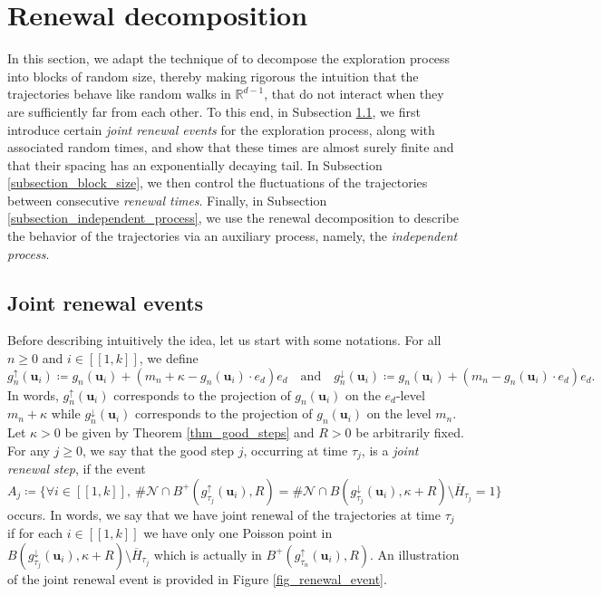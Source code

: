 \documentclass[a4paper, 11pt]{article}
\theoremstyle{plain}
\theoremstyle{definition}
\newcommand{\R}{\mathbb{R}}
\newcommand{\range}[2]{[\![#1,#2]\!]}
\numberwithin{equation}{section}
\begin{document}
\section{Renewal decomposition}

\label{section_renewal}

In this section, we adapt the technique of \cite{Dsf2d} to decompose the exploration process into blocks of random size, thereby making rigorous the intuition that the trajectories behave like random walks in $\R^{d-1}$, that do not interact when they are sufficiently far from each other. To this end, in Subsection \ref{subsection_renewal_event}, we first introduce certain \emph{joint renewal events} for the exploration process, along with associated random times, and show that these times are almost surely finite and that their spacing has an exponentially decaying tail. In Subsection \ref{subsection_block_size}, we then control the fluctuations of the trajectories between consecutive \emph{renewal times}. Finally, in Subsection \ref{subsection_independent_process}, we use the renewal decomposition to describe the behavior of the trajectories via an auxiliary process, namely, the \emph{independent process}.


\subsection{Joint renewal events}

\label{subsection_renewal_event}


Before describing intuitively the idea, let us start with some notations. For all $n\geq 0$ and $i\in\range{1}{k}$, we define
    \[g_n^\uparrow(\mathbf u_i)\coloneqq g_n(\mathbf u_i)+(m_n+\kappa-g_n(\mathbf u_i)\cdot e_d)e_d\quad \text{and}\quad g_n^\downarrow(\mathbf u_i)\coloneqq g_n(\mathbf u_i)+(m_n-g_n(\mathbf u_i)\cdot e_d)e_d.\]
In words, $g_n^\uparrow(\mathbf u_i)$ corresponds to the projection of $g_n(\mathbf u_i)$ on the $e_d$-level $m_n+\kappa$ while $g_n^\downarrow(\mathbf u_i)$ corresponds to the projection of $g_n(\mathbf u_i)$ on the level $m_n$. Let $\kappa>0$ be given by Theorem \ref{thm_good_steps} and $R>0$ be arbitrarily fixed. For any $j\geq 0$, we say that the good step $j$, occurring at time $\tau_j$, is a \emph{joint renewal step}, if the event
    \[A_j\coloneqq\{\forall i\in\range{1}{k},~\#\mathcal N\cap B^+(g_{\tau_j}^\uparrow(\mathbf u_i), R)=\#\mathcal N\cap B(g_{\tau_j}^\downarrow(\mathbf u_i), \kappa+R)\setminus\overline{H}_{\tau_j}=1\}\]
occurs. In words, we say that we have joint renewal of the trajectories at time $\tau_j$ if for each $i\in\range{1}{k}$ we have only one Poisson point in $B(g_{\tau_j}^\downarrow(\mathbf u_i), \kappa+R)\setminus\overline{H}_{\tau_j}$ which is actually in $B^+(g_{\tau_n}^\uparrow(\mathbf u_i), R)$. An illustration of the joint renewal event is provided in Figure \ref{fig_renewal_event}.
\end{document}
